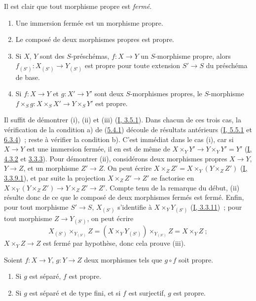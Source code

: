 Il est clair que tout morphisme propre est \emph{fermé}.

\begin{proposition}[5.4.2]
\label{II.5.4.2-fr}
\begin{enumerate}
  \item[\rm{(i)}] Une immersion fermée est un morphisme propre.
  \item[\rm{(ii)}] Le composé de deux morphismes propres est propre.
  \item[\rm{(iii)}] Si $X$, $Y$ sont des $S$-préschémas,
  $f:X\to Y$ un $S$-morphisme propre, alors
  $f_{(S')}:X_{(S')}\to Y_{(S')}$ est propre pour toute extension
  $S'\to S$ du préschéma de base.
  \item[\rm{(iv)}] Si $f:X\to Y$ et $g:X'\to Y'$ sont deux $S$-morphismes
  propres, le $S$-morphisme
  $f\times_Sg:X\times_SX'\to Y\times_SY'$ est propre.
\end{enumerate}
\end{proposition}


Il suffit de démontrer (i), (ii) et (iii) (\hyperref[I.3.5.1-fr]{I, 3.5.1}).
Dans chacun de ces trois cas, la vérification de la condition a) de
(\hyperref[II.5.4.1-fr]{5.4.1}) découle de résultats antérieurs
(\hyperref[I.5.5.1-fr]{I, 5.5.1} et \hyperref[I.6.3.4-fr]{6.3.4})~; reste à
vérifier la condition b). C'est immédiat dans le cas (i), car si $X\to Y$
est une immersion fermée, il en est de même de
$X\times_YY'\to Y\times_YY'=Y'$ (\hyperref[I.4.3.2-fr]{I, 4.3.2} et
\hyperref[II.3.3.3-fr]{3.3.3}). Pour démontrer (ii), considérons deux
morphismes propres $X\to Y$, $Y\to Z$, et un morphisme $Z'\to Z$. On peut
écrire $X\times_ZZ'=X\times_Y(Y\times_ZZ')$
(\hyperref[I.3.3.9.1-fr]{I, 3.3.9.1}), et par suite la projection
$X\times_ZZ'\to Z'$ se factorise en
$X\times_Y(Y\times_ZZ')\to Y\times_ZZ'\to Z'$. Compte tenu de la remarque
du début, (ii) résulte donc de ce que le composé de deux morphismes fermés
est fermé. Enfin, pour tout morphisme $S'\to S$, $X_{(S')}$ s'identifie à
$X\times_YY_{(S')}$ (\hyperref[I.3.3.11-fr]{I, 3.3.11})~; pour tout
morphisme $Z\to Y_{(S')}$, on peut écrire
\[
  X_{(S')}\times_{Y_{(S')}}Z
  =(X\times_YY_{(S')})\times_{Y_{(S')}}Z=X\times_YZ~;
\]
$X\times_YZ\to Z$ est fermé par hypothèse, donc cela prouve (iii).

\begin{corollary}[5.4.3]
\label{II.5.4.3-fr}
Soient $f:X\to Y$, $g:Y\to Z$ deux morphismes tels que $g\circ f$ soit
propre.
\begin{enumerate}
  \item[\rm{(i)}] Si $g$ est séparé, $f$ est propre.
  \item[\rm{(ii)}] Si $g$ est séparé et de type fini, et si $f$ est
  surjectif, $g$ est propre.
\end{enumerate}
\end{corollary}

